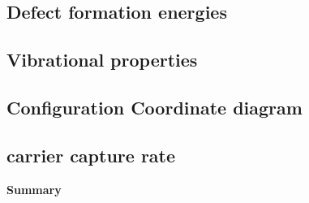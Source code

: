 \subsection{Defect formation energies}


\subsection{Vibrational properties}

\subsection{Configuration Coordinate diagram}




\subsection{carrier capture rate}



\textbf{Summary}

